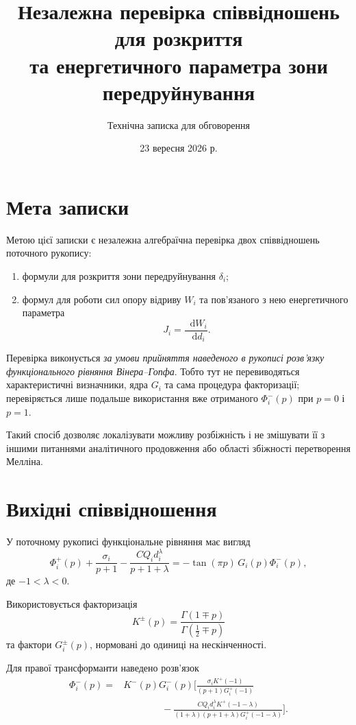\documentclass[12pt,a4paper]{article}
\title{\textbf{Незалежна перевірка співвідношень для розкриття\\
та енергетичного параметра зони передруйнування}}
\author{Технічна записка для обговорення}
\date{23 вересня 2026 р.}
\newcommand{\dd}{\mathop{}\!\mathrm{d}}
\begin{document}
\maketitle

\section*{Мета записки}

Метою цієї записки є незалежна алгебраїчна перевірка двох співвідношень
поточного рукопису:
\begin{enumerate}
  \item формули для розкриття зони передруйнування $\delta_i$;
  \item формул для роботи сил опору відриву $W_i$ та пов'язаного з нею
  енергетичного параметра
  \[
    J_i=\frac{\dd W_i}{\dd d_i}.
  \]
\end{enumerate}

Перевірка виконується \emph{за умови прийняття наведеного в рукописі
розв'язку функціонального рівняння Вінера--Гопфа}. Тобто тут не
перевиводяться характеристичні визначники, ядра $G_i$ та сама процедура
факторизації; перевіряється лише подальше використання вже отриманого
$\Phi_i^-(p)$ при $p=0$ і $p=1$.

Такий спосіб дозволяє локалізувати можливу розбіжність і не змішувати її
з іншими питаннями аналітичного продовження або області збіжності
перетворення Мелліна.

\section{Вихідні співвідношення}

У поточному рукописі функціональне рівняння має вигляд
\begin{equation}
\label{eq:WH}
  \Phi_i^+(p)
  +\frac{\sigma_i}{p+1}
  -\frac{C Q_i d_i^\lambda}{p+1+\lambda}
  =
  -\tan(\pi p)\,G_i(p)\Phi_i^-(p),
\end{equation}
де $-1<\lambda<0$.

Використовується факторизація
\begin{equation}
\label{eq:Kdef}
  K^\pm(p)=
  \frac{\Gamma(1\mp p)}
       {\Gamma\!\left(\tfrac12\mp p\right)}
\end{equation}
та фактори $G_i^\pm(p)$, нормовані до одиниці на нескінченності.

Для правої трансформанти наведено розв'язок
\begin{equation}
\label{eq:PhiMinus}
\begin{aligned}
\Phi_i^-(p)
={}&K^-(p)G_i^-(p)
\Bigg[
\frac{\sigma_iK^+(-1)}
     {(p+1)G_i^+(-1)}
\\
&\qquad\qquad
-
\frac{C Q_i d_i^\lambda K^+(-1-\lambda)}
     {(1+\lambda)(p+1+\lambda)G_i^+(-1-\lambda)}
\Bigg].
\end{aligned}
\end{equation}
\end{document}
